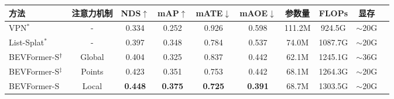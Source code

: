 \begin{tabular}{l  c |c c c c |c c c  c }
\toprule
方法 &  注意力机制 & NDS$\uparrow$  & mAP$\uparrow$  & mATE$\downarrow$    & mAOE$\downarrow$       & 参数量 &FLOPs& 显存 \\
\midrule


VPN$^*$~\cite{pan2020cross}&- & 0.334 &0.252 &0.926 &0.598 & 111.2M &924.5G &$\sim\!$20G\\
List-Splat$^*$~\cite{philion2020lift}&- &  0.397 & 0.348 &0.784 &0.537 &74.0M & 1087.7G&$\sim\!$20G \\

\midrule
\rowcolor{gray95}
BEVFormer-S$^{\text{\textdagger}}$ &Global & 0.404 & 0.325 & 0.837 &0.442&62.1M & 1245.1G& $\sim\!$36G\\ %
\rowcolor{gray9}
BEVFormer-S$^\ddag$& Points &0.423 &0.351 &0.753&0.442  & 68.1M & 1264.3G&$\sim\!$20G\\
\rowcolor{gray85}
BEVFormer-S& Local &\textbf{0.448} &\textbf{0.375}&\textbf{0.725} &\textbf{0.391} & 68.7M &1303.5G &$\sim\!$20G\\
\bottomrule
\end{tabular}